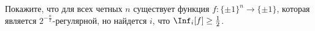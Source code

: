 Покажите, что для всех четных $n$ существует функция $f\colon \{\pm 1\}^n \to \{\pm 1\}$, которая
является $2^{-\frac{n}{2}}$-регулярной, но найдется $i$, что $\Inf_i[f] \ge \frac{1}{2}$.